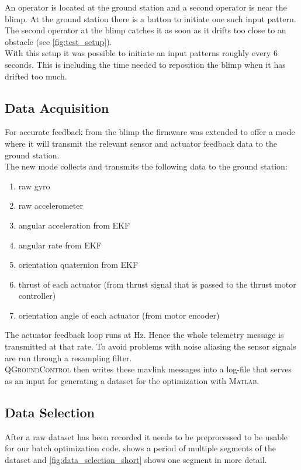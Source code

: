 An operator is located at the ground station and a second operator is near the blimp.
At the ground station there is a button to initiate one such input pattern.
The second operator at the blimp catches it as soon as it drifts too close to an obstacle (see \cref{fig:test_setup}). \\
With this setup it was possible to initiate an input patterns roughly every 6 seconds. 
This is including the time needed to reposition the blimp when it has drifted too much.



\subsection{Data Acquisition}
\label{sub:data_acquisition}
For accurate feedback from the blimp the firmware was extended to offer a mode where it will transmit the relevant sensor and actuator feedback data to the ground station. \\
The new mode collects and transmits the following data to the ground station:
\begin{enumerate}
\item raw gyro
\item raw accelerometer
\item angular acceleration from EKF
\item angular rate from EKF
\item orientation quaternion from EKF
\item thrust of each actuator (from thrust signal that is passed to the thrust motor controller)
\item orientation angle of each actuator (from motor encoder)
\end{enumerate}
The actuator feedback loop runs at \unit[25]{Hz}.
Hence the whole telemetry message is transmitted at that rate.
To avoid problems with noise aliasing the sensor signals are run through a resampling filter.\\
\textsc{QGroundControl} then writes these mavlink messages into a log-file that serves as an input for generating a dataset for the optimization with \textsc{Matlab}.

\subsection{Data Selection}
\label{sub:data_selection}
After a raw dataset has been recorded it needs to be preprocessed to be usable for our batch optimization code.
 shows a period of multiple segments of the dataset and \cref{fig:data_selection_short} shows one segment in more detail.
\\


